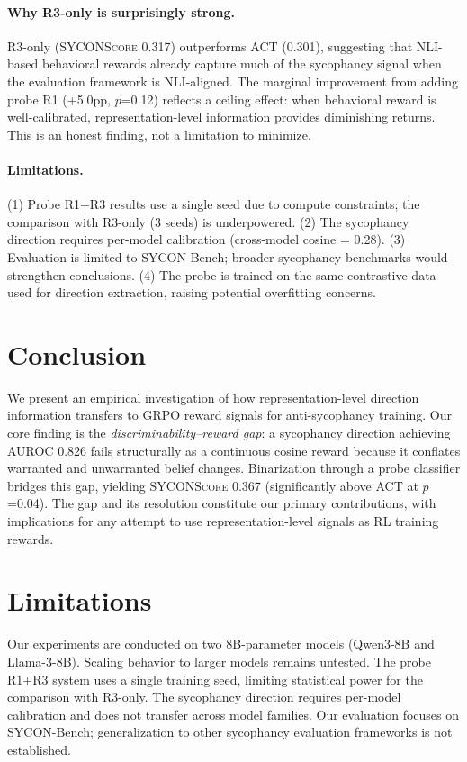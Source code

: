 \documentclass[11pt,a4paper]{article}
\newcommand{\sycon}{\textsc{SYCONScore}}
\begin{document}
\paragraph{Why R3-only is surprisingly strong.} R3-only (\sycon{} 0.317) outperforms ACT (0.301), suggesting that NLI-based behavioral rewards already capture much of the sycophancy signal when the evaluation framework is NLI-aligned. The marginal improvement from adding probe R1 (+5.0pp, $p$=0.12) reflects a ceiling effect: when behavioral reward is well-calibrated, representation-level information provides diminishing returns. This is an honest finding, not a limitation to minimize.

\paragraph{Limitations.} (1) Probe R1+R3 results use a single seed due to compute constraints; the comparison with R3-only (3 seeds) is underpowered. (2) The sycophancy direction requires per-model calibration (cross-model cosine = 0.28). (3) Evaluation is limited to SYCON-Bench; broader sycophancy benchmarks would strengthen conclusions. (4) The probe is trained on the same contrastive data used for direction extraction, raising potential overfitting concerns.


\section{Conclusion}

We present an empirical investigation of how representation-level direction information transfers to GRPO reward signals for anti-sycophancy training. Our core finding is the \emph{discriminability--reward gap}: a sycophancy direction achieving AUROC 0.826 fails structurally as a continuous cosine reward because it conflates warranted and unwarranted belief changes. Binarization through a probe classifier bridges this gap, yielding \sycon{} 0.367 (significantly above ACT at $p$=0.04). The gap and its resolution constitute our primary contributions, with implications for any attempt to use representation-level signals as RL training rewards.

\section*{Limitations}

Our experiments are conducted on two 8B-parameter models (Qwen3-8B and Llama-3-8B). Scaling behavior to larger models remains untested. The probe R1+R3 system uses a single training seed, limiting statistical power for the comparison with R3-only. The sycophancy direction requires per-model calibration and does not transfer across model families. Our evaluation focuses on SYCON-Bench; generalization to other sycophancy evaluation frameworks is not established.
\end{document}
